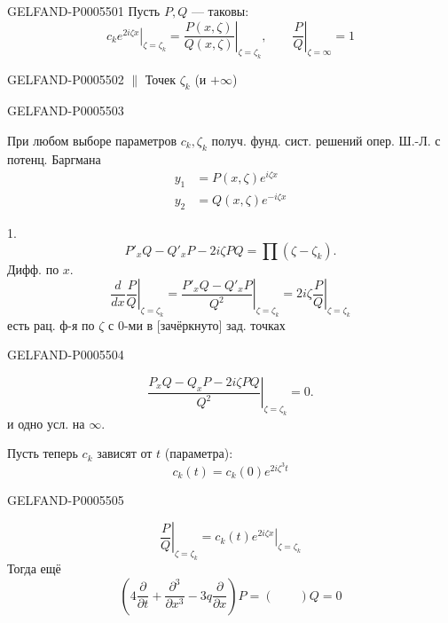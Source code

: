 \begin{GelfandAdjacentEvidence}{GELFAND-P000550}{1}
Пусть \(P,Q\) — таковы:
\[
\left.c_k e^{2i\zeta x}\right|_{\zeta=\zeta_k}
=\left.\frac{P(x,\zeta)}{Q(x,\zeta)}\right|_{\zeta=\zeta_k},
\qquad
\left.\frac{P}{Q}\right|_{\zeta=\infty}=1
\]
\end{GelfandAdjacentEvidence}
\begin{GelfandAdjacentEvidence}{GELFAND-P000550}{2}
\(\parallel\) Точек \(\zeta_k\)
\quad{} (и \(+\infty\))
\end{GelfandAdjacentEvidence}
\begin{GelfandAdjacentEvidence}{GELFAND-P000550}{3}


При любом выборе параметров \(c_k,\zeta_k\) получ. фунд. сист. решений опер. Ш.-Л. с потенц. Баргмана
\[
\begin{aligned}
y_1&=P(x,\zeta)e^{i\zeta x}\\
y_2&=Q(x,\zeta)e^{-i\zeta x}
\end{aligned}
\]

1.
\[
P'_x Q-Q'_x P-2i\zeta P Q=\prod(\zeta-\zeta_k).
\]
Дифф. по \(x\).
\[
\frac{d}{dx}\left.\frac P Q\right|_{\zeta=\zeta_k}
=\left.\frac{P'_x Q-Q'_x P}{Q^2}\right|_{\zeta=\zeta_k}
=2i\zeta\left.\frac{P}{Q}\right|_{\zeta=\zeta_k}
\]
есть рац. ф-я по \(\zeta\) с 0-ми в [зачёркнуто] зад. точках
\end{GelfandAdjacentEvidence}
\begin{GelfandAdjacentEvidence}{GELFAND-P000550}{4}

\[
\left.\frac{P_x Q-Q_x P-2i\zeta P Q}{Q^2}\right|_{\zeta=\zeta_k}=0.
\]
и одно усл. на \(\infty\).

Пусть теперь \(c_k\) зависят от \(t\) (параметра):
\[
c_k(t)=c_k(0)e^{2i\zeta^3 t}
\]
\end{GelfandAdjacentEvidence}
\begin{GelfandAdjacentEvidence}{GELFAND-P000550}{5}

\[
\left.\frac P Q\right|_{\zeta=\zeta_k}
=\left.c_k(t)e^{2i\zeta x}\right|_{\zeta=\zeta_k}
\]
Тогда ещё
\[
\left(4\frac{\partial}{\partial t}+\frac{\partial^3}{\partial x^3}
-3q\frac{\partial}{\partial x}\right)P=(\qquad)Q=0
\]
\end{GelfandAdjacentEvidence}
